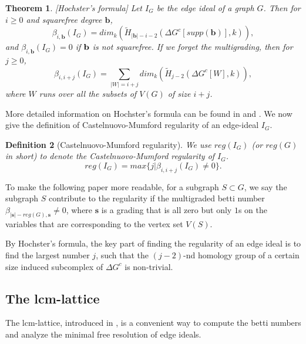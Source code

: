 \documentclass[dvipsnames,10pt]{article}
\newtheorem{theorem}{Theorem}[section]
\newtheorem{defi}[theorem]{Definition}
\begin{document}
\begin{theorem}[Hochster's formula]
    Let $I_G$ be the edge ideal of a graph $G$. Then for $i\geq 0$ and squarefree degree $\mathbf{b}$,
    \begin{equation*}
        \beta_{i,\mathbf{b}}(I_G)=dim_k(\widetilde{H}_{|\mathbf{b}|-i-2}\left(\Delta G^c[supp(\mathbf{b})], k\right)),
    \end{equation*}
    and $\beta_{i,\mathbf{b}}(I_G)=0$ if $\bf{b}$ is not squarefree. If we forget the multigrading, then for $j\geq0$,
    \begin{equation*}
        \beta_{i,i+j}(I_G)=\sum_{|W|=i+j}dim_k(\widetilde{H}_{j-2}\left(\Delta G^c[W], k\right)),
    \end{equation*}
    where $W$ runs over all the subsets of $V(G)$ of size $i+j$.
\end{theorem}
More detailed information on Hochster's formula can be found in \cite{stanley1996combinatorics} and \cite{francisco2014survey}. We now give the definition of Castelnuovo-Mumford regularity of an edge-ideal $I_G$.
\begin{defi}[Castelnuovo-Mumford regularity]
    We use $reg(I_G)$ (or $reg(G)$ in short) to denote the Castelnuovo-Mumford regularity of $I_G$. 
    \begin{equation*}
    reg(I_G)=max\{j|\beta_{i,i+j}(I_G)\neq0\}.    
    \end{equation*}
\end{defi}

To make the following paper more readable, for a subgraph $S\subset G$, we say the subgraph $S$ contribute to the regularity if the multigraded betti number $\beta_{|\mathbf{s}|-reg(G),\mathbf{s}}\neq 0$, where $\mathbf{s}$ is a grading that is all zero but only $1$s on the variables that are corresponding to the vertex set $V(S)$.

By Hochster's formula, the key part of finding the regularity of an edge ideal is to find the largest number $j$, such that the $(j-2)$-nd homology group of a certain size induced subcomplex of $\Delta G^c$ is non-trivial. 

\subsection{The lcm-lattice}

The lcm-lattice, introduced in \cite{welker1999lcm}, is a convenient way to compute the betti numbers and analyze the minimal free resolution of edge ideals. 
\end{document}
